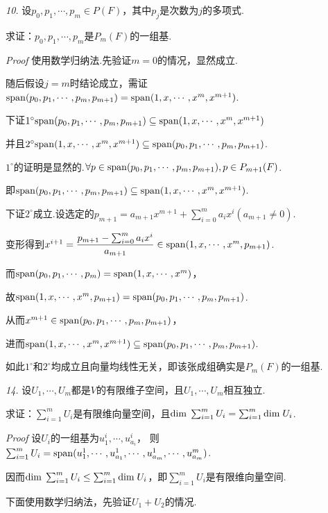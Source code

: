 \textit{10.}
设\(p_0,p_1,\cdots,p_m\in P(F)\)，其中\(p_j\)是次数为\(j\)的多项式.

求证：\(p_0,p_1,\cdots,p_m\)是\(P_m(F)\)的一组基.

\textit{Proof}
使用数学归纳法.先验证\(m=0\)的情况，显然成立.

随后假设\(j=m\)时结论成立，需证\(\mathrm{span} (p_0,p_1,\cdots,p_m,p_{m+1})=\mathrm{span} (1,x,\cdots,x^m,x^{m+1})\).

下证\(1^{\circ}\mathrm{span} (p_0,p_1,\cdots,p_m,p_{m+1}) \subseteq \mathrm{span} (1,x,\cdots,x^m,x^{m+1})\)

并且\(2^{\circ}\mathrm{span} (1,x,\cdots,x^m,x^{m+1}) \subseteq \mathrm{span} (p_0,p_1,\cdots,p_m,p_{m+1})\).

\(1^{\circ}\)的证明是显然的.\(\forall p\in \mathrm{span} (p_0,p_1,\cdots,p_m,p_{m+1}),p\in P_{m+1}(F)\).

即\(\mathrm{span} (p_0,p_1,\cdots,p_m,p_{m+1})\subseteq \mathrm{span} (1,x,\cdots,x^m,x^{m+1})\).

下证\(2^{\circ}\)成立.设选定的\(p_{m+1}=a_{m+1}x^{m+1}+\sum_{i=0}^m a_ix^i(a_{m+1} \ne 0)\).

变形得到\(x^{i+1}=\dfrac{p_{m+1}-\sum_{i=0}^m a_ix^i}{a_{m+1}} \in \mathrm{span} (1,x,\cdots,x^m,p_{m+1})\).

而\(\mathrm{span} (p_0,p_1,\cdots,p_m)=\mathrm{span} (1,x,\cdots,x^m)\)，

故\(\mathrm{span} (1,x,\cdots,x^m,p_{m+1})=\mathrm{span} (p_0,p_1,\cdots,p_m,p_{m+1})\).

从而\(x^{m+1}\in \mathrm{span} (p_0,p_1,\cdots,p_m,p_{m+1})\)，

进而\(\mathrm{span} (1,x,\cdots,x^m,x^{m+1}) \subseteq \mathrm{span} (p_0,p_1,\cdots,p_m,p_{m+1})\).

如此\(1^{\circ}\)和\(2^{\circ}\)均成立且向量均线性无关，即该张成组确实是\(P_m(F)\)的一组基.

\hspace*{\fill}

\textit{14.}
设\(U_1,\cdots,U_m\)都是\(V\)的有限维子空间，且\(U_1,\cdots,U_m\)相互独立.

求证：\(\sum_{i=1}^m U_i\)是有限维向量空间，且\(\mathrm{dim \;} \sum_{i=1}^m U_i=\sum_{i=1}^m \mathrm{dim \;} U_i\).

\textit{Proof}
设\(U_i\)的一组基为\(u_1^i,\cdots,u_{a_i}^i\)，
则\(\sum_{i=1}^m U_i=\mathrm{span}(u_1^1,\cdots,u_{a_1}^1,\cdots,u_{a_m}^1,\cdots,u_{a_m}^m)\).

因而\(\mathrm{dim \;} \sum_{i=1}^m U_i \leq \sum_{i=1}^m \mathrm{dim \;} U_i\)，即\(\sum_{i=1}^m U_i\)是有限维向量空间.

下面使用数学归纳法，先验证\(U_1+U_2\)的情况.

